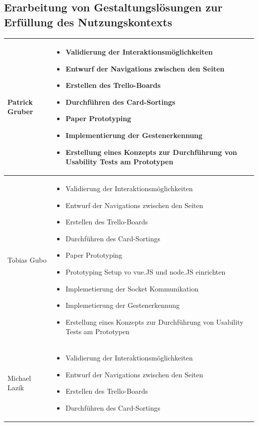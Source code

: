 \documentclass[12pt, a4paper]{scrartcl}
\begin{document}
	\subsection*{Erarbeitung von Gestaltungslösungen zur Erfüllung des Nutzungskontexts}
	\begin{tabularx}{0.95\textwidth}{|l|X|}
		\hline
		Patrick Gruber & 
		\begin{itemize}
			\setlength{\itemsep}{-0.6em}
			\item  Validierung der Interaktionsmöglichkeiten
			\item  Entwurf der Navigations zwischen den Seiten
			\item Erstellen des Trello-Boards
			\item Durchführen des Card-Sortings
			\item Paper Prototyping
			\item Implementierung der Gestenerkennung
			\item Erstellung eines Konzepts zur Durchführung von Usability Tests am Prototypen
		\end{itemize}\\
		\hline
		Tobias Gubo & \begin{itemize}
			\setlength{\itemsep}{-0.6em}
			\item  Validierung der Interaktionsmöglichkeiten
			\item  Entwurf der Navigations zwischen den Seiten
			\item Erstellen des Trello-Boards
			\item Durchführen des Card-Sortings
			\item Paper Prototyping
			\item Prototyping Setup vo vue.JS und node.JS einrichten
			\item Implemetierung der Socket Kommunikation
			\item Implemetierung der Gestenerkennung
			\item Erstellung eines Konzepts zur Durchführung von Usability Tests am Prototypen
		\end{itemize} \\
		\hline
		Michael Lazik &  \begin{itemize}
			\setlength{\itemsep}{-0.6em}
			\item  Validierung der Interaktionsmöglichkeiten
			\item  Entwurf der Navigations zwischen den Seiten
			\item Erstellen des Trello-Boards
			\item Durchführen des Card-Sortings

\end{itemize}
\end{tabularx}
\end{document}
